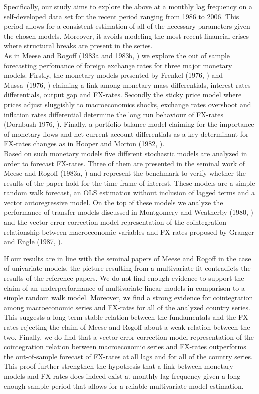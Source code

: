 Specifically, our study aims to explore the above at a monthly lag frequency on a self-developed data set for the recent period ranging from 1986 to 2006. This period allows for a consistent estimation of all of the necessary parameters given the chosen models. Moreover, it avoids modeling the most recent financial crises where structural breaks are present in the series.\\
As in Meese and Rogoff (1983a and 1983b, \cite{MeeseRogoffa,MeeseRogoffb}) we explore the out of sample forecasting perfomance of foreign exchange rates for three major monetary models. Firstly, the monetary models presented by Frenkel (1976, \cite{Frenkel1976}) and  Mussa\ (1976, \cite{Mussa1976}) claiming a link among monetary mass differentials, interest rates differentials, output gap and FX-rates. Secondly the sticky price model where prices adjust sluggishly to macroeconomics shocks, exchange rates overshoot and inflation rates differential determine the long run behaviour of FX-rates (Dornbush 1976, \cite{Dornbusch}). Finally, a portfolio balance model claiming for the importance of monetary flows and net current account differentials as a key determinant for FX-rates changes as in Hooper and Morton (1982, \cite{HooperMorton1982}). \\
Based on such monetary models five different stochastic models are analyzed in order to forecast FX-rates. Three of them are presented in the seminal work of Meese and Rogoff (1983a, \cite{MeeseRogoffa}) and represent the benchmark to verify whether the results of the paper hold for the time frame of interest. These models are a simple random walk forecast, an OLS estimation without inclusion of lagged terms and a vector autoregressive model. On the top of these models we analyze the performance of transfer models discussed in Montgomery and Weatherby (1980, \cite{MontgomeryWeatherby}) and the vector error correction model representation of the cointegration relationship between macroeconomic variables and FX-rates proposed by Granger and Engle (1987,  \cite{EngleGranger}).

If our results are in line with the seminal papers of Meese and Rogoff in the case of univariate models, the picture resulting from a multivariate fit
contradicts the results of the reference papers. We do not find enough evidence to support the claim of an underperformance of multivariate
linear models in comparison to a simple random walk model. Moreover, we find a strong evidence for cointegration among macroeconomic series and
FX-rates for all of the analyzed country series. This suggests a long term stable relation between the fundamentals and the FX-rates rejecting
the claim of Meese and Rogoff about a weak relation between the two. Finally, we do find that a vector error correction model representation of the cointegration
relation between macroeconomic series and FX-rates outperforms the out-of-sample forecast of FX-rates at all lags and for all of the country series. This proof further
strengthen the hypothesis that a link between monetary models and FX-rates does indeed exist at monthly lag frequency given a long enough sample period that allows
for a reliable multivariate model estimation.

